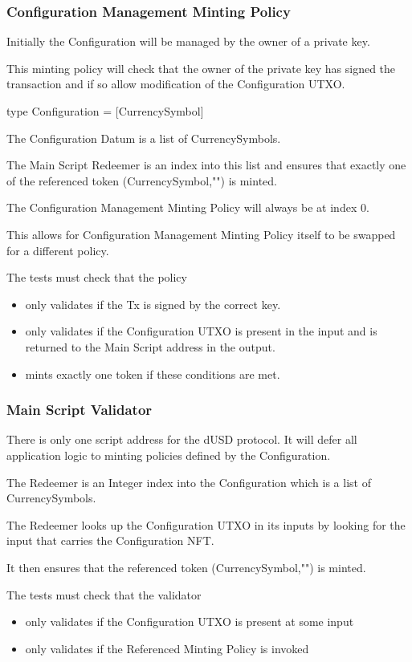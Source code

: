 \documentclass{article} %
\begin{document}
\subsubsection{Configuration Management Minting Policy}
Initially the Configuration will be managed by the owner of a private key.

This minting policy will check that the owner of the private key has signed the transaction and if so allow modification of the Configuration UTXO.

type Configuration = [CurrencySymbol]

The Configuration Datum is a list of CurrencySymbols.

The Main Script Redeemer is an index into this list and ensures that exactly one of the referenced token (CurrencySymbol,"") is minted.

The Configuration Management Minting Policy will always be at index 0.

This allows for Configuration Management Minting Policy itself to be swapped for a different policy.

The tests must check that the policy
\begin{itemize}
  \item only validates if the Tx is signed by the correct key.
  \item only validates if the Configuration UTXO is present in the input and is returned to the Main Script address in the output.
  \item mints exactly one token if these conditions are met.
\end{itemize}

\subsubsection{Main Script Validator}
There is only one script address for the dUSD protocol. It will defer all application logic to minting policies defined by the Configuration.

The Redeemer is an Integer index into the Configuration which is a list of CurrencySymbols.

The Redeemer looks up the Configuration UTXO in its inputs by looking for the input that carries the Configuration NFT.

It then ensures that the referenced token (CurrencySymbol,"") is minted.

The tests must check that the validator
\begin{itemize}
  \item only validates if the Configuration UTXO is present at some input
  \item only validates if the Referenced Minting Policy is invoked
\end{itemize}
\end{document}
